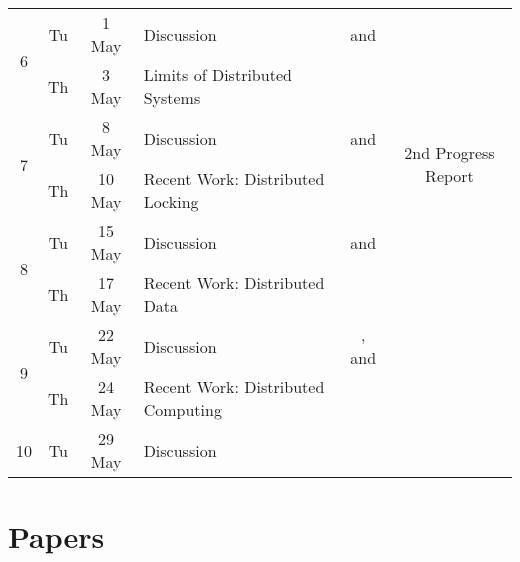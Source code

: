 \documentclass[11pt]{article}
\begin{document}
\begin{sidewaystable}
\begin{tabular}{|c|cc||p{8cm}|c|c|}
\multirow{2}{*}{6}  & Tu & 1 May & Discussion                                           & \cite{Fidge_1988} and \cite{Mattern89virtualtime} & \cellcolor[gray]{0.9}  \\\cline{2-5}
                    & Th & 3 May & Limits of Distributed Systems                        & \cellcolor[gray]{0.9} & \cellcolor[gray]{0.9}  \\\hline\hline

\multirow{2}{*}{7}  & Tu & 8 May & Discussion                                           & \cite{Lynch:1989:HIP:72981.72982} and \cite{Gilbert:2002:BCF:564585.564601} & \multirow{2}{*}{2nd Progress Report}  \\\cline{2-5}
                    & Th & 10 May & Recent Work: Distributed Locking                   & \cellcolor[gray]{0.9} &   \\\hline\hline

\multirow{2}{*}{8}  & Tu & 15 May & Discussion                                         & \cite{Burrows:2006:CLS:1298455.1298487} and \cite{Chandra:2007:PML:1281100.1281103} & \cellcolor[gray]{0.9}  \\\cline{2-5}
                    & Th & 17 May & Recent Work: Distributed Data                      & \cellcolor[gray]{0.9} & \cellcolor[gray]{0.9}  \\\hline\hline

\multirow{2}{*}{9}  & Tu & 22 May & Discussion                                         & \cite{Chang:2006:BDS:1267308.1267323}, \cite{DeCandia:2007:DAH:1294261.1294281}
 and \cite{Lakshman:2010:CDS:1773912.1773922}  & \cellcolor[gray]{0.9}  \\\cline{2-5}
                    & Th & 24 May & Recent Work: Distributed Computing                 & \cellcolor[gray]{0.9} & \cellcolor[gray]{0.9}  \\\hline\hline

{10}  & Tu & 29 May & Discussion                                                       & \cite{Dean:2008:MSD:1327452.1327492} & \cellcolor[gray]{0.9}  \\\hline
\end{tabular}
\label{tab:calendar}
\end{sidewaystable}


\section{Papers}
\label{sec:papers}


\end{document}
